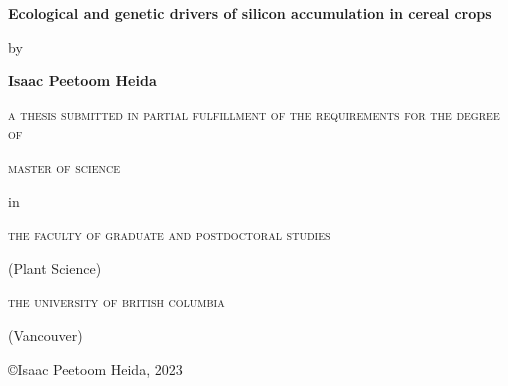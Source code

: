 \begin{titlepage}
    \begin{center}
        \vspace*{1cm}

        \textbf{Ecological and genetic drivers of silicon accumulation in cereal crops}

        \vspace{1cm}

        by 

        \vspace{1cm}

        \textbf{Isaac Peetoom Heida}
        
        \vfill

        \textsc{a thesis submitted in partial fulfillment of the requirements for the degree of}

        \vspace{1cm}

        \textsc{master of science}

        in

        \textsc{the faculty of graduate and postdoctoral studies}

        (Plant Science)

        \textsc{the university of british columbia}

        (Vancouver)

        \copyright Isaac Peetoom Heida, 2023
    \end{center}
\end{titlepage}